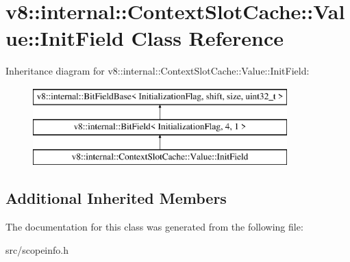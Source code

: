 \hypertarget{classv8_1_1internal_1_1_context_slot_cache_1_1_value_1_1_init_field}{}\section{v8\+:\+:internal\+:\+:Context\+Slot\+Cache\+:\+:Value\+:\+:Init\+Field Class Reference}
\label{classv8_1_1internal_1_1_context_slot_cache_1_1_value_1_1_init_field}
Inheritance diagram for v8\+:\+:internal\+:\+:Context\+Slot\+Cache\+:\+:Value\+:\+:Init\+Field\+:\begin{figure}[H]
\begin{center}
\leavevmode
\includegraphics[height=3.000000cm]{classv8_1_1internal_1_1_context_slot_cache_1_1_value_1_1_init_field}
\end{center}
\end{figure}
\subsection*{Additional Inherited Members}


The documentation for this class was generated from the following file\+:\begin{DoxyCompactItemize}
\item 
src/scopeinfo.\+h\end{DoxyCompactItemize}
